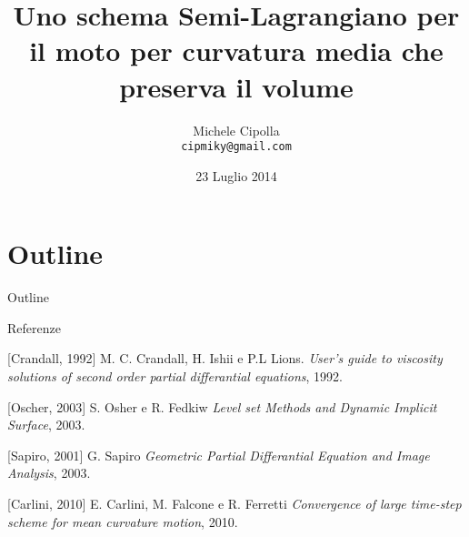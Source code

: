 \documentclass[10pt]{beamer}
\title{Uno schema Semi-Lagrangiano per il moto per curvatura media che
  preserva il volume}
\author{Michele Cipolla \\
\texttt{cipmiky@gmail.com}}
\institute[Dip. Matematica]{Sapienza Università di Roma}
\date{23 Luglio 2014}
\begin{document}
%
%
\begin{frame}
\titlepage
\end{frame}
%
%
\section*{Outline}
\begin{frame}{Outline}
\tableofcontents
\end{frame}
%
%





%
%
\begin{frame}{Referenze}
\begin{thebibliography}{bella}
[Crandall, 1992]
  M. C. Crandall, H. Ishii e P.L Lions.
  \newblock \emph{User's guide to viscosity solutions of second order
    partial differantial equations}, 1992.

[Oscher, 2003] 
  S. Osher e R. Fedkiw
  \newblock \emph{Level set Methods and Dynamic Implicit Surface}, 2003.

[Sapiro, 2001] 
  G. Sapiro
  \newblock \emph{Geometric Partial Differantial Equation and Image
    Analysis}, 2003.

[Carlini, 2010] 
  E. Carlini, M. Falcone e R. Ferretti
  \newblock \emph{Convergence of large time-step scheme for mean
    curvature motion}, 2010.

\end{thebibliography}
\end{frame}
%
%
%
\end{document}
